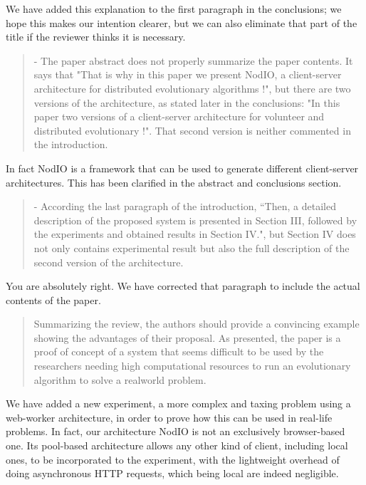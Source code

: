 \documentclass[preprint]{elsarticle}
\begin{document}
We have added this explanation to the first paragraph in the
conclusions; we hope this makes our intention clearer, but we can also
eliminate that part of the title if the reviewer thinks it is
necessary.

\begin{quote}
- The paper abstract does not properly summarize the paper contents. It says that "That is why in this
paper we present NodIO, a client-server architecture for distributed evolutionary algorithms !", but there
are two versions of the architecture, as stated later in the conclusions: "In this paper two versions of a
client-server architecture for volunteer and distributed evolutionary !". That second version is neither
commented in the introduction.
\end{quote}

In fact {\sf NodIO} is a framework that can be used to generate
different client-server architectures. This has been clarified in the
abstract and conclusions section. 

\begin{quote}
- According the last paragraph of the introduction, ``Then, a detailed description of the proposed system is
presented in Section III, followed by the experiments and obtained results in Section IV.", but Section IV
does not only contains experimental result but also the full description of the second version of the
architecture.
\end{quote}

You are absolutely right. We have corrected that paragraph to include
the actual contents of the paper. 

\begin{quote}
Summarizing the review, the authors should provide a convincing example showing the advantages of
their proposal. As presented, the paper is a proof of concept of a system that seems difficult to be used
by the researchers needing high computational resources to run an evolutionary algorithm to solve a realworld
problem.
\end{quote}

We have added a new experiment, a more complex and taxing problem
using a web-worker architecture, in order to prove how this can be
used in real-life problems. In fact, our architecture {\sf NodIO} is
not an exclusively browser-based one. Its pool-based architecture allows
any other kind of client, including local ones, to be incorporated to
the experiment, with the lightweight overhead of doing asynchronous
HTTP requests, which being local are indeed negligible. 
\end{document}

